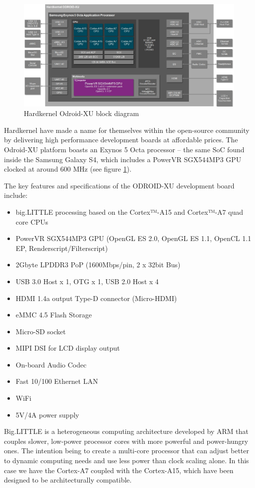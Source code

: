 \begin{figure}[t!]
\centering
\includegraphics[width=0.9\linewidth]{Figures/Hardkernel-ODROID-XU-block_diagram.jpg}
\caption{Hardkernel Odroid-XU block diagram}
\label{odroid-xu}
\end{figure}

Hardkernel have made a name for themselves within the open-source community by delivering high performance development boards at affordable prices. The Odroid-XU platform boasts an Exynos 5 Octa processor – the same SoC found inside the Samsung Galaxy S4, which includes a PowerVR SGX544MP3 GPU clocked at around 600 MHz (see figure \ref{odroid-xu}).

The key features and specifications of the ODROID-XU development board include:
\begin{itemize}
\item big.LITTLE processing based on the Cortex™-A15 and Cortex™-A7 quad core CPUs
\item PowerVR SGX544MP3 GPU (OpenGL ES 2.0, OpenGL ES 1.1, OpenCL 1.1 EP, Renderscript/Filterscript)
\item 2Gbyte LPDDR3 PoP (1600Mbps/pin, 2 x 32bit Bus)
\item USB 3.0 Host x 1, OTG x 1, USB 2.0 Host x 4
\item HDMI 1.4a output Type-D connector (Micro-HDMI)
\item eMMC 4.5 Flash Storage
\item Micro-SD socket
\item MIPI DSI for LCD display output
\item On-board Audio Codec
\item Fast 10/100 Ethernet LAN
\item WiFi
\item 5V/4A power supply
\end{itemize}

Big.LITTLE is a heterogeneous computing architecture developed by ARM that couples slower, low-power processor cores with more powerful and power-hungry ones. The intention being to create a multi-core processor that can adjust better to dynamic computing needs and use less power than clock scaling alone. In this case we have the Cortex-A7 coupled with the Cortex-A15, which have been designed to be architecturally compatible.

